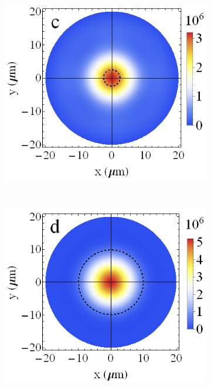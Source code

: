 \documentclass[aps,prapplied,amsmath,amssymb,onecolumn,superscriptaddress,showpacs,floatfix,longbibliography]{revtex4-1}
\begin{document}
\begin{figure}[h]
\begin{subfigure}[h]{0.32\linewidth}
		\includegraphics[width=\linewidth]{Fig3c.png}
	\end{subfigure}
	\\
	\begin{subfigure}[h]{0.32\linewidth}
		\includegraphics[width=\linewidth]{Fig3d.png}
	\end{subfigure}
	\begin{subfigure}[h]{0.32\linewidth}

\end{subfigure}
\end{figure}
\end{document}
